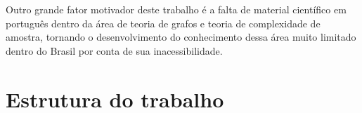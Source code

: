 Outro grande fator motivador deste trabalho é a falta de material científico em português dentro da área de teoria de grafos e teoria de complexidade de amostra, tornando o desenvolvimento do conhecimento dessa área muito limitado dentro do Brasil por conta de
sua inacessibilidade.

\section{Estrutura do trabalho}\label{sec:estruturaTrabalho}

